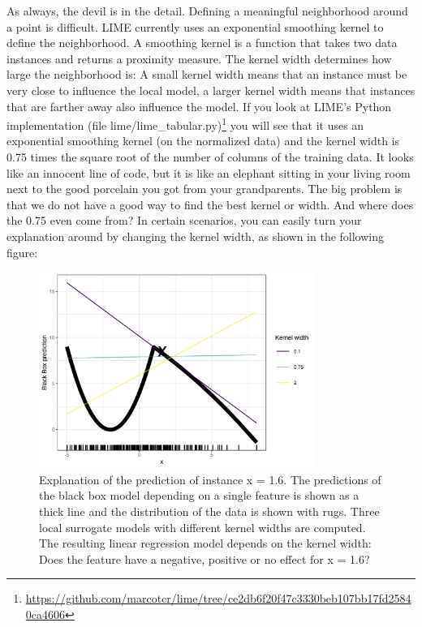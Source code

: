 \documentclass[
  11pt,
]{scrbook}
\renewcommand{\href}[2]{#2\footnote{\url{#1}}}
\begin{document}
As always, the devil is in the detail.
Defining a meaningful neighborhood around a point is difficult.
LIME currently uses an exponential smoothing kernel to define the neighborhood.
A smoothing kernel is a function that takes two data instances and returns a proximity measure.
The kernel width determines how large the neighborhood is:
A small kernel width means that an instance must be very close to influence the local model, a larger kernel width means that instances that are farther away also influence the model.
If you look at \href{https://github.com/marcotcr/lime/tree/ce2db6f20f47c3330beb107bb17fd25840ca4606}{LIME's Python implementation (file lime/lime\_tabular.py)} you will see that it uses an exponential smoothing kernel (on the normalized data) and the kernel width is 0.75 times the square root of the number of columns of the training data.
It looks like an innocent line of code, but it is like an elephant sitting in your living room next to the good porcelain you got from your grandparents.
The big problem is that we do not have a good way to find the best kernel or width.
And where does the 0.75 even come from?
In certain scenarios, you can easily turn your explanation around by changing the kernel width, as shown in the following figure:

\begin{figure}

{\centering \includegraphics[width=0.8\textwidth]{images/lime-fail-1} 

}

\caption{Explanation of the prediction of instance x = 1.6. The predictions of the black box model depending on a single feature is shown as a thick line and the distribution of the data is shown with rugs. Three local surrogate models with different kernel widths are computed. The resulting linear regression model depends on the kernel width: Does the feature have a negative, positive or no effect for x = 1.6?}\label{fig:lime-fail}
\end{figure}
\end{document}
